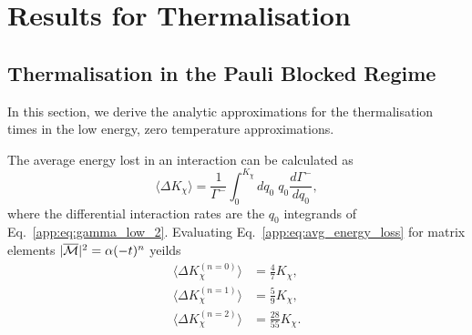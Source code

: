 \chapter{Results for Thermalisation}
\label{app:thermalisation_results}


\section{Thermalisation in the Pauli Blocked Regime}
\label{sec:pauliblockingle}
In this section, we derive the analytic approximations for the thermalisation times in the low energy, zero temperature approximations.

The average energy lost in an interaction can be calculated as
\begin{equation}
    \langle \Delta K_\chi \rangle = \frac{1}{\Gamma^-}\int_0^{K_\chi} dq_0\; q_0 \frac{d \Gamma^-}{d q_0},
    \label{app:eq:avg_energy_loss}
\end{equation}
where the differential interaction rates are the $q_0$ integrands of Eq.~\ref{app:eq:gamma_low_2}. Evaluating Eq.~\ref{app:eq:avg_energy_loss} for matrix elements $|\overline{\mathcal M}|^2 = \alpha (-t)^n$ yeilds
\begin{align}
    \langle \Delta K_\chi^{ (n = 0)} \rangle & = \frac{4}{7}K_\chi,\\
    \langle \Delta K_\chi^{ (n = 1)} \rangle & = \frac{5}{9}K_\chi,\\
    \langle \Delta K_\chi^{ (n = 2)} \rangle & = \frac{28}{55}K_\chi.
\end{align}

